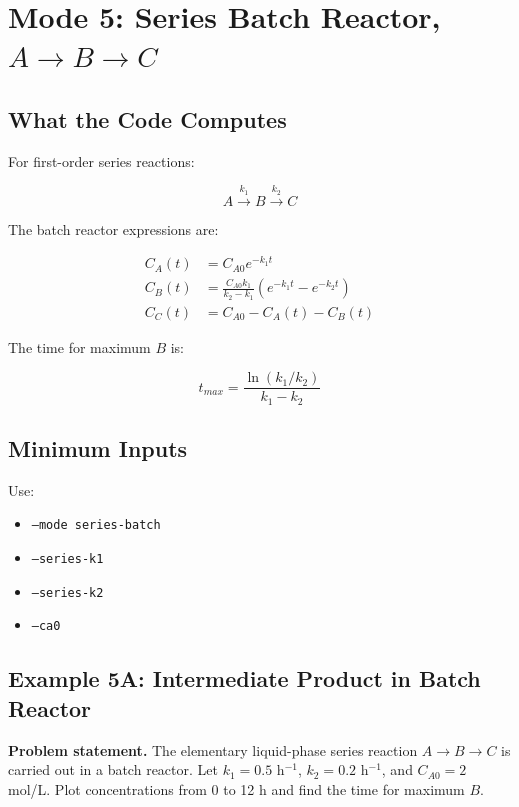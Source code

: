 \documentclass[11pt]{article}
\begin{document}
\section{Mode 5: Series Batch Reactor, $A \to B \to C$}

\subsection{What the Code Computes}

For first-order series reactions:

\begin{equation}
A \xrightarrow{k_1} B \xrightarrow{k_2} C
\end{equation}

The batch reactor expressions are:

\begin{align}
C_A(t) &= C_{A0}e^{-k_1t} \\
C_B(t) &= \frac{C_{A0}k_1}{k_2-k_1}\left(e^{-k_1t}-e^{-k_2t}\right) \\
C_C(t) &= C_{A0}-C_A(t)-C_B(t)
\end{align}

The time for maximum $B$ is:

\begin{equation}
t_{max} = \frac{\ln(k_1/k_2)}{k_1-k_2}
\end{equation}

\subsection{Minimum Inputs}

Use:

\begin{itemize}
    \item \texttt{--mode series-batch}
    \item \texttt{--series-k1}
    \item \texttt{--series-k2}
    \item \texttt{--ca0}
\end{itemize}

\subsection{Example 5A: Intermediate Product in Batch Reactor}

\textbf{Problem statement.} The elementary liquid-phase series reaction $A \to B \to C$ is carried out in a batch reactor. Let $k_1=0.5$ h$^{-1}$, $k_2=0.2$ h$^{-1}$, and $C_{A0}=2$ mol/L. Plot concentrations from 0 to 12 h and find the time for maximum $B$.
\end{document}
